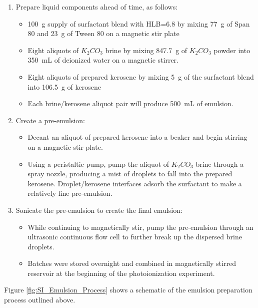 
\begin{enumerate}
    \item Prepare liquid components ahead of time, as follows:
    \begin{itemize}
        \item \SI{100} {g} supply of surfactant blend with HLB=6.8 by mixing \SI{77} {g} of Span 80 and \SI{23} {g} of Tween 80 on a magnetic stir plate 
        \item Eight aliquots of $K_{2}CO_{3}$ brine by mixing \SI{847.7} {g} of $K_{2}CO_{3}$ powder into \SI{350} {mL} of deionized water on a magnetic stirrer. 
        \item Eight aliquots of prepared kerosene by mixing \SI{5} {g} of the surfactant blend into \SI{106.5} {g} of kerosene  
        \item Each brine/kerosene aliquot pair will produce \SI{500} {mL} of emulsion. 
    \end{itemize}

    \item Create a pre-emulsion:
    \begin{itemize}
        \item Decant an aliquot of prepared kerosene into a beaker and begin stirring on a magnetic stir plate. 
        \item Using a peristaltic pump, pump the aliquot of $K_{2}CO_{3}$ brine through a spray nozzle, producing a mist of droplets to fall into the prepared kerosene. Droplet/kerosene interfaces adsorb the surfactant to make a relatively fine pre-emulsion. 
    \end{itemize}

    \item Sonicate the pre-emulsion to create the final emulsion:
    \begin{itemize}
        \item While continuing to magnetically stir, pump the pre-emulsion through an ultrasonic continuous flow cell to further break up the dispersed brine droplets. 
        \item Batches were stored overnight and combined in magnetically stirred reservoir at the beginning of the photoionization experiment. 
    \end{itemize}
\end{enumerate}

Figure \ref{fig:SI_Emulsion_Process} shows a schematic of the emulsion preparation process outlined above. 


